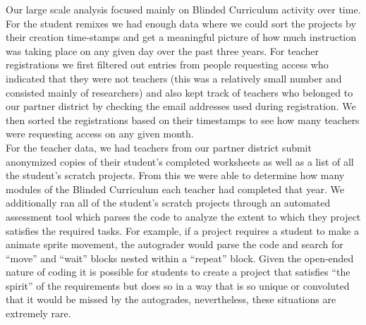 \documentclass[sigconf,manuscript,review,anonymous]{acmart} %
\def\ts{TIPP\&SEE}
\newcommand{\Scratchencore}[0]{Blinded Curriculum}
\begin{document}
Our large scale analysis focused mainly on \Scratchencore{} activity over time. For the
student remixes we had enough data where we could sort the projects by their creation
time-stamps and get a meaningful picture of how much instruction was taking place on
any given day over the past three years. For teacher registrations we first filtered out entries
from people requesting access who indicated that they were not teachers (this was a relatively small number
and consisted mainly of researchers) and also kept track of teachers who belonged to
our partner district by checking the email addresses used during registration. We then sorted the registrations based on their timestamps
to see how many teachers were requesting access on any given month.\\
  For the teacher data, we had teachers from our partner district submit anonymized copies
of  their student's completed worksheets as well as a list of all the student's scratch projects.
From this we were able to determine how many modules of the \Scratchencore{} each
teacher had completed that year. We additionally ran all of the student's scratch projects 
through an automated assessment tool which parses the code to analyze the extent to which
they project satisfies the required tasks. For example, if a project requires a student to
make a animate sprite movement, the autograder would parse the code and search for
``move'' and ``wait'' blocks nested within a “repeat” block. Given the open-ended nature
of coding it is possible for students to create a project that satisfies ``the spirit'' of the
requirements but does so in a way that is so unique or convoluted that it would be missed 
by the autogrades, nevertheless, these situations are extremely rare.
\end{document}
